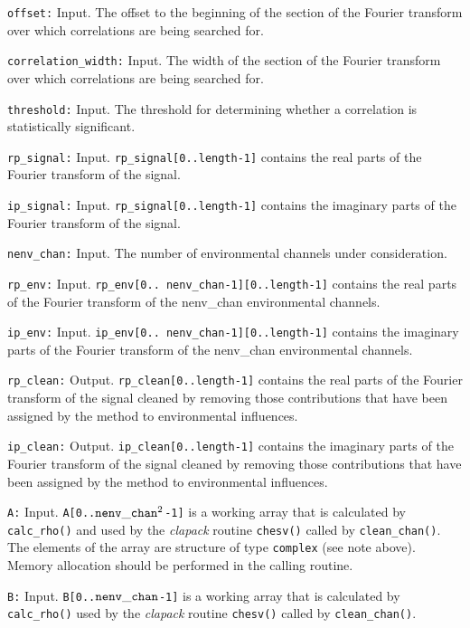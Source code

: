 \begin{description}
\item{\tt offset:} Input. The offset to the beginning of the section
  of the Fourier transform over which correlations are being searched for.
\item{\tt correlation\_width:} Input.  The width of the section
  of the Fourier transform over which correlations are being searched for.
\item{\tt threshold:} Input. The threshold for determining whether a
correlation is statistically significant.
\item{\tt rp\_signal:} Input. {\tt  rp\_signal[0..length-1]} contains the
  real parts of the Fourier transform of the signal.
\item{\tt ip\_signal:} Input. {\tt  rp\_signal[0..length-1]} contains the
  imaginary parts of the Fourier transform of the signal.
\item{\tt nenv\_chan:} Input. The number of environmental channels under
  consideration.
\item{\tt rp\_env:} Input. {\tt  rp\_env[0.. nenv\_chan-1][0..length-1]} contains the
  real parts of the Fourier transform of the nenv\_chan environmental channels.
\item{\tt ip\_env:} Input. {\tt  ip\_env[0.. nenv\_chan-1][0..length-1]} contains the
  imaginary parts of the Fourier transform of the nenv\_chan environmental
  channels.
\item{\tt rp\_clean:} Output. {\tt  rp\_clean[0..length-1]} contains the
  real parts of the Fourier transform of the signal cleaned by
  removing those contributions that have been assigned by the method
  to environmental influences.
\item{\tt ip\_clean:} Output. {\tt  ip\_clean[0..length-1]} contains the
  imaginary parts of the Fourier transform of the signal cleaned by
  removing those contributions that have been assigned by the method
  to environmental influences.
\item{\tt A:} Input. {\tt A[0..${\tt nenv\_chan}^2$-1]} is a working
  array that is calculated by {\tt calc\_rho()} and used by the {\sl
  clapack} routine {\tt chesv()} called by {\tt clean\_chan()}.  
  The elements of the array are structure of type {\tt complex} (see
  note above).  Memory allocation should be performed in the
  calling routine.
\item{\tt B:} Input. {\tt B[0..${\tt nenv\_chan}$-1]} is a working
  array that is calculated by {\tt calc\_rho()} used by the {\sl
    clapack} 
routine {\tt chesv()} called by {\tt clean\_chan()}.  

\end{description}
